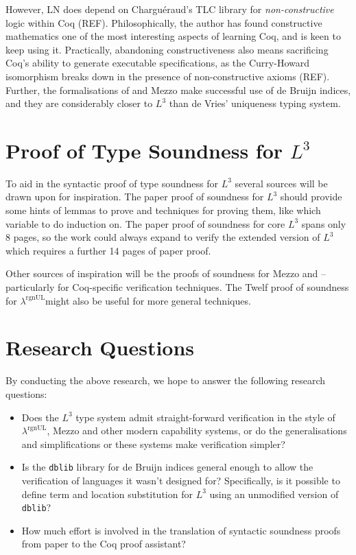 \documentclass[]{unswthesis}
\newcommand{\rgnUL}{$\lambda^\text{rgnUL}$\text{ }}
\newcommand{\SSPHS}{\text{SSPHS }}
\begin{document}
However, LN does depend on Chargu\'{e}raud's TLC library for \textit{non-constructive} logic within Coq (REF). Philosophically, the author has found constructive mathematics one of the most interesting aspects of learning Coq, and is keen to keep using it. Practically, abandoning constructiveness also means sacrificing Coq's ability to generate executable specifications, as the Curry-Howard isomorphism breaks down in the presence of non-constructive axioms (REF). Further, the formalisations of \SSPHS and Mezzo make successful use of de Bruijn indices, and they are considerably closer to $L^3$ than de Vries' uniqueness typing system.

\section{Proof of Type Soundness for $L^3$}

To aid in the syntactic proof of type soundness for $L^3$ several sources will be drawn upon for inspiration. The paper proof of soundness for $L^3$ should provide some hints of lemmas to prove and techniques for proving them, like which variable to do induction on. The paper proof of soundness for core $L^3$ spans only 8 pages, so the work could always expand to verify the extended version of $L^3$ which requires a further 14 pages of paper proof.

Other sources of inspiration will be the proofs of soundness for Mezzo and \SSPHS -- particularly for Coq-specific verification techniques. The Twelf proof of soundness for \rgnUL might also be useful for more general techniques.

\section{Research Questions}

By conducting the above research, we hope to answer the following research questions:

\begin{itemize}
\item Does the $L^3$ type system admit straight-forward verification in the style of \rgnUL, Mezzo and other modern capability systems, or do the generalisations and simplifications or these systems make verification simpler?
\item Is the \texttt{dblib} library for de Bruijn indices general enough to allow the verification of languages it wasn't designed for? Specifically, is it possible to define term and location substitution for $L^3$ using an unmodified version of \texttt{dblib}?
\item How much effort is involved in the translation of syntactic soundness proofs from paper to the Coq proof assistant?
\end{itemize}
\end{document}
